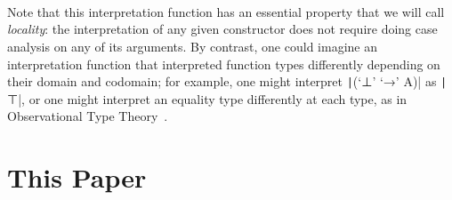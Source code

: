 \begin{code}
\>[2] \AgdaSymbol{:}  \AgdaSymbol{\{} \AgdaSymbol{\}}\<%
\\
\>[2]\<[4]%
\>[4]  \AgdaSymbol{\{}\AgdaSymbol{\}}   \AgdaSymbol{(} \AgdaSymbol{:}   \AgdaSymbol{)}     \<%
\\
\>[0]\<[2]%
\>[2]    \<[18]%
\>[18]\AgdaSymbol{=} \<%
\\
\>[0]\<[2]%
\>[2]      \AgdaSymbol{=}    \AgdaSymbol{(} \AgdaInductiveConstructor{,} \AgdaSymbol{)}\<%
\end{code}

  Note that this interpretation function has an essential property
  that we will call \emph{locality}: the interpretation of any given
  constructor does not require doing case analysis on any of its
  arguments.  By contrast, one could imagine an interpretation
  function that interpreted function types differently depending on
  their domain and codomain; for example, one might interpret
  \texttt|(‘⊥’ ‘→’ A)| as \texttt|⊤|, or one might
  interpret an equality type differently at each type, as in
  Observational Type Theory~\cite{Altenkirch:2007:OE:1292597.1292608}.

\section{This Paper}

